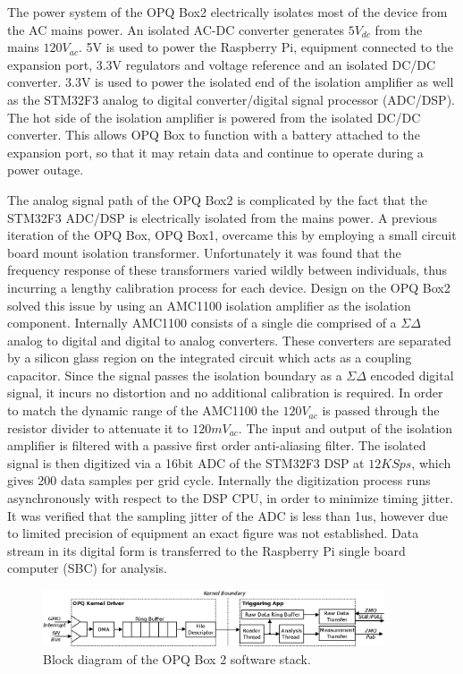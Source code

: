 The power system of the OPQ Box2 electrically isolates most of the device from the AC mains power.
An isolated AC-DC converter generates $5V_{dc}$ from the mains $120V_{ac}$.
5V is used to power the Raspberry Pi, equipment connected to the expansion port, 3.3V regulators and voltage reference and an isolated DC/DC converter.
3.3V is used to power the isolated end of the isolation amplifier as well as the STM32F3 analog to digital converter/digital signal processor (ADC/DSP).
The hot side of the isolation amplifier is powered from the isolated DC/DC converter.
This allows OPQ Box to function with a battery attached to the expansion port, so that it may retain data and continue to operate during a power outage.

The analog signal path of the OPQ Box2 is complicated by the fact that the STM32F3 ADC/DSP is electrically isolated from the mains power.
A previous iteration of the OPQ Box, OPQ Box1, overcame this by employing a small circuit board mount isolation transformer.
Unfortunately it was found that the frequency response of these transformers varied wildly between individuals, thus incurring a lengthy calibration process for each device.
Design on the OPQ Box2 solved this issue by using an AMC1100 isolation amplifier as the isolation component.
Internally AMC1100 consists of a single die comprised of a $\Sigma\Delta$ analog to digital and digital to analog converters.
These converters are separated by a silicon glass region on the integrated circuit which acts as a coupling capacitor.
Since the signal passes the isolation boundary as a $\Sigma\Delta$ encoded digital signal, it incurs no distortion and no additional calibration is required.
In order to match the dynamic range of the AMC1100 the $120V_{ac}$ is passed through the resistor divider to attenuate it to $120mV_{ac}$.
The input and output of the isolation amplifier is filtered with a passive first order anti-aliasing filter.
The isolated signal is then digitized via a 16bit ADC of the STM32F3 DSP at $12 KSps$, which gives 200 data samples per grid cycle.
Internally the digitization process runs asynchronously with respect to the DSP CPU, in order to minimize timing jitter.
It was verified that the sampling jitter of the ADC is less than 1us, however due to limited precision of equipment an exact figure was not established.
Data stream in its digital form is transferred to the Raspberry Pi single board computer (SBC) for analysis.

\begin{figure}[h]
  \begin{center}
  \includegraphics[width=0.9\textwidth]{img/opqbox_software.png}
  \end{center}
  \caption{Block diagram of the OPQ Box 2 software stack.}
  \label{fig:opq:3}
\end{figure}

